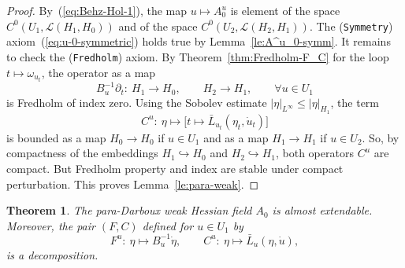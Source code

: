 \documentclass[pdftex]{sigma}
\numberwithin{equation}{section}
\newtheorem{Theorem}{Theorem}[section]
\newcommand{\Ll}{{\mathcal{L}}} %
\def\abs#1{\mathopen|#1\mathclose|}
\newcommand{\p}{{\partial}}
\newcommand{\INTO}{\hookrightarrow} %
\newcommand{\1}{{{\mathchoice {\rm 1\mskip-4mu l} {\rm 1\mskip-4mu l}
{\rm 1\mskip-4.5mu l} {\rm 1\mskip-5mu l}}}}
\begin{document}
\begin{proof}
By~(\ref{eq:Behz-Hol-1}),
the map $u\mapsto A^u_0$ is
element of the space $C^0(U_1,\Ll(H_1,H_0))$ and
of the space $C^0(U_2,\Ll(H_2,H_1))$.
The (\texttt{Symmetry}) axiom~(\ref{eq:u-0-symmetric}) holds true by
Lemma~\ref{le:A^u_0-symm}.
It remains to check the (\texttt{Fredholm}) axiom.
By Theorem~\ref{thm:Fredholm-F_C}
for the loop $t\mapsto \omega_{u_t}$, the operator as a map
\begin{equation}\label{eq:hjghjghj77799}
 B_u^{-1}\p_t\colon\ H_1\to H_0,\qquad H_2\to H_1
 ,\qquad \forall u\in U_1
\end{equation}
is Fredholm of index zero.
Using the Sobolev estimate $\abs{\eta}_{L^\infty}\le\abs{\eta}_{H_1}$,
the term
\[
 C^u\colon\ \eta\mapsto \bigl[t\mapsto \bar L_{u_t}(\eta_t,\dot u_t) \bigr]
\]
is bounded as a map $H_0\to H_0$ if $u\in U_1$ and as a map
$H_1\to H_1$ if $u\in U_2$.
So, by compactness of the embeddings
$H_1\INTO H_0$ and $H_2\INTO H_1$, both operators $C^u$ are compact.
But Fredholm property and index are stable under compact perturbation.
This proves Lemma~\ref{le:para-weak}.
\end{proof}

\begin{Theorem}\label{thm:paradarboux-Hess}
The para-Darboux weak Hessian field $A_0$ is almost extendable.
Moreover, the pair $(F,C)$ defined for $u\in U_1$ by
\[
 F^u\colon\ \eta\mapsto B_u^{-1}\dot \eta
 ,\qquad
 C^u\colon\ \eta\mapsto \bar L_u(\eta,\dot u) ,
\]
is a decomposition.
\end{Theorem}
\end{document}
